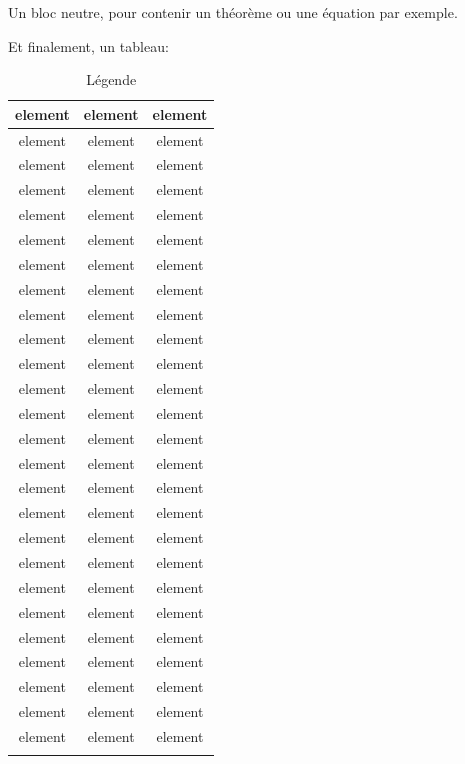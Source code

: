 \documentclass[small]{zmdocument}
\begin{document}
\begin{Information}
\blindtext
\end{Information}

\begin{Neutral}
Un bloc neutre, pour contenir un théorème ou une équation par exemple.
\end{Neutral}

Et finalement, un tableau:

\begin{longtabu}{|c|c|c|} \hline
element & element & element\\ \hline
element & element & element\\ \hline
element & element & element\\ \hline
element & element & element\\ \hline
element & element & element\\ \hline
element & element & element\\ \hline
element & element & element\\ \hline
element & element & element\\ \hline
element & element & element\\ \hline
element & element & element\\ \hline
element & element & element\\ \hline
element & element & element\\ \hline
element & element & element\\ \hline
element & element & element\\ \hline
element & element & element\\ \hline
element & element & element\\ \hline
element & element & element\\ \hline
element & element & element\\ \hline
element & element & element\\ \hline
element & element & element\\ \hline
element & element & element\\ \hline
element & element & element\\ \hline
element & element & element\\ \hline
element & element & element\\ \hline
element & element & element\\ \hline
element & element & element\\ \hline
\caption{Légende}
\end{longtabu}
\end{document}
